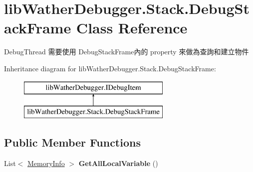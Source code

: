 \hypertarget{classlib_wather_debugger_1_1_stack_1_1_debug_stack_frame}{\section{lib\+Wather\+Debugger.\+Stack.\+Debug\+Stack\+Frame Class Reference}
\label{classlib_wather_debugger_1_1_stack_1_1_debug_stack_frame}
}


Debug\+Thread 需要使用 Debug\+Stack\+Frame內的 property 來做為查詢和建立物件  


Inheritance diagram for lib\+Wather\+Debugger.\+Stack.\+Debug\+Stack\+Frame\+:\begin{figure}[H]
\begin{center}
\leavevmode
\includegraphics[height=2.000000cm]{classlib_wather_debugger_1_1_stack_1_1_debug_stack_frame}
\end{center}
\end{figure}
\subsection*{Public Member Functions}
\begin{DoxyCompactItemize}
\item 
\hypertarget{classlib_wather_debugger_1_1_stack_1_1_debug_stack_frame_acf23bb21c60f7f471131d56b251c23b2}{List$<$ \hyperlink{classlib_wather_debugger_1_1_memory_1_1_memory_info}{Memory\+Info} $>$ {\bfseries Get\+All\+Local\+Variable} ()}\label{classlib_wather_debugger_1_1_stack_1_1_debug_stack_frame_acf23bb21c60f7f471131d56b251c23b2}

\end{DoxyCompactItemize}
